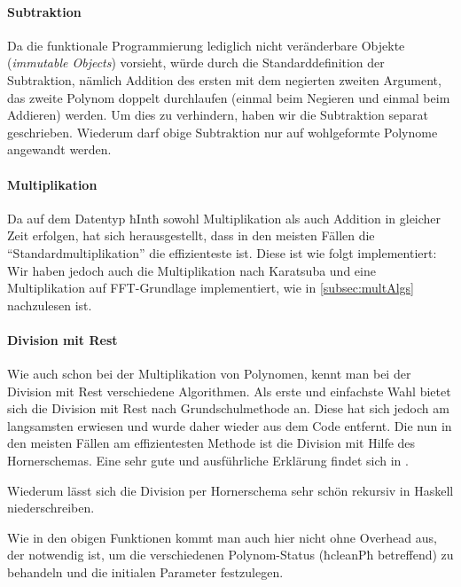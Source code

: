 \paragraph{Subtraktion} Da die funktionale Programmierung lediglich 
nicht veränderbare Objekte (\emph{immutable Objects}) vorsieht, würde durch die
Standarddefinition der Subtraktion, nämlich Addition des ersten mit dem
negierten zweiten Argument, das zweite Polynom doppelt durchlaufen (einmal beim
Negieren und einmal beim Addieren) werden. Um dies zu verhindern, haben wir die
Subtraktion separat geschrieben.
Wiederum darf obige Subtraktion nur auf wohlgeformte Polynome angewandt werden.

\paragraph{Multiplikation}
Da auf dem Datentyp ħIntħ sowohl Multiplikation als auch Addition in gleicher
Zeit erfolgen, hat sich herausgestellt, dass in den meisten Fällen die 
"`Standardmultiplikation"' die effizienteste ist. Diese ist wie folgt
implementiert:
Wir haben jedoch auch die Multiplikation nach Karatsuba und eine Multiplikation
auf FFT-Grundlage implementiert, wie in \autoref{subsec:multAlgs} nachzulesen ist.

\paragraph{Division mit Rest}
Wie auch schon bei der Multiplikation von Polynomen, kennt man bei der Division
mit Rest verschiedene Algorithmen. Als erste und einfachste Wahl bietet sich
die Division mit Rest nach Grundschulmethode an. Diese hat sich jedoch am
langsamsten erwiesen und wurde daher wieder aus dem Code entfernt. Die nun in
den meisten Fällen am effizientesten Methode ist die Division mit Hilfe des
Hornerschemas. Eine sehr gute und ausführliche Erklärung findet sich 
in \autocite{wiki:synthetic-division}.

Wiederum lässt sich die Division per Hornerschema sehr schön rekursiv in
Haskell niederschreiben.

Wie in den obigen Funktionen kommt man auch hier nicht ohne Overhead aus, der
notwendig ist, um die verschiedenen Polynom-Status (ħcleanPħ betreffend) zu
behandeln und die initialen Parameter festzulegen.

